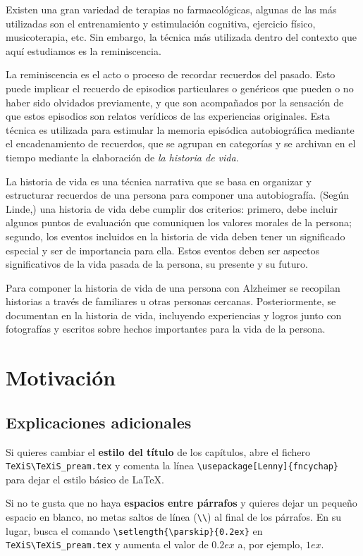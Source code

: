 Existen una gran variedad de terapias no farmacológicas, algunas de las más utilizadas son el entrenamiento y estimulación cognitiva, ejercicio físico, musicoterapia, etc. Sin embargo, la técnica más utilizada dentro del contexto que aquí estudiamos es la reminiscencia.

La reminiscencia es el acto o proceso de recordar recuerdos del pasado. Esto puede implicar el recuerdo de episodios particulares o genéricos que pueden o no haber sido olvidados previamente, y que son acompañados por la sensación de que estos episodios son relatos verídicos de las experiencias originales. Esta técnica es utilizada para estimular la memoria episódica autobiográfica mediante el encadenamiento de recuerdos, que se agrupan en categorías y se archivan en el tiempo mediante la elaboración de \textit{la historia de vida}.

La historia de vida es una técnica narrativa que se basa en organizar y estructurar recuerdos de una persona para componer una autobiografía. (Según Linde,) una historia de vida debe cumplir dos criterios: primero, debe incluir algunos puntos de evaluación que comuniquen los valores morales de la persona; segundo, los eventos incluidos en la historia de vida deben tener un significado especial y ser de importancia para ella. Estos eventos deben ser aspectos significativos de la vida pasada de la persona, su presente y su futuro.

Para componer la historia de vida de una persona con Alzheimer se recopilan historias a través de familiares u otras personas cercanas. Posteriormente, se documentan en la historia de vida, incluyendo experiencias y logros junto con fotografías y escritos sobre hechos importantes para la vida de la persona.




\section{Motivación}
\subsection{Explicaciones adicionales}
Si quieres cambiar el \textbf{estilo del título} de los capítulos, abre el fichero \verb|TeXiS\TeXiS_pream.tex| y comenta la línea \verb|\usepackage[Lenny]{fncychap}| para dejar el estilo básico de \LaTeX.

Si no te gusta que no haya \textbf{espacios entre párrafos} y quieres dejar un pequeño espacio en blanco, no metas saltos de línea (\verb|\\|) al final de los párrafos. En su lugar, busca el comando  \verb|\setlength{\parskip}{0.2ex}| en \verb|TeXiS\TeXiS_pream.tex| y aumenta el valor de $0.2ex$ a, por ejemplo, $1ex$.


